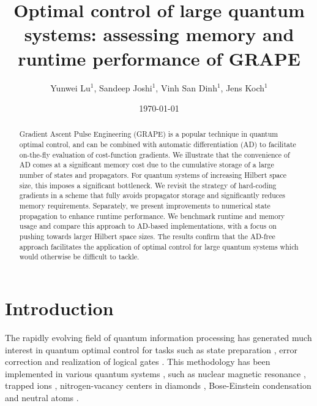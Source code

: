 \documentclass[letterpaper,10pt]{iopart}
\begin{document}
\title{Optimal control of large quantum systems: assessing memory and runtime performance of GRAPE}

\author{Yunwei Lu$^1$, Sandeep Joshi$^1$, Vinh San Dinh$^{1}$, Jens Koch$^1$}
\address{$^1$ Department of Physics and Astronomy, Northwestern University, Evanston, Illinois 60208, USA}



\date{\today}

\begin{abstract}
Gradient Ascent Pulse Engineering (GRAPE) is a popular technique in quantum optimal control, and can be combined with automatic differentiation (AD) to facilitate on-the-fly evaluation of cost-function gradients. We illustrate that the convenience of AD comes at a significant memory cost due to the cumulative storage of a large number of states and propagators. For quantum systems of increasing Hilbert space size, this imposes a significant bottleneck. We revisit the strategy of hard-coding gradients in a scheme that fully avoids propagator storage and significantly reduces memory requirements. Separately, we present improvements to numerical state propagation to enhance runtime performance. We benchmark runtime and memory usage and compare this approach to AD-based implementations, with a focus on pushing towards larger Hilbert space sizes. The results confirm that the AD-free approach facilitates the application of optimal control for large quantum systems which would otherwise be difficult to tackle.
\end{abstract}


\section{\label{sec:level1}Introduction}

The rapidly evolving field of quantum information processing has generated much interest in quantum optimal control for tasks such as state preparation  \cite{rojan2014arbitrarystate,bondar2023globally}, error correction \cite{waldherr2014quantumerror,gertler2021protecting} and realization of logical gates \cite{scabdelhafez2020universal,scallen2017optimal,schuang2014optimal,scwerninghaus2021leakage}. This methodology has been implemented in various quantum systems \cite{glaser2015training}, such as nuclear magnetic resonance \cite{nmrbretschneider2012conversion,nmrkehlet2004improving,nmrkhaneja2005optimal,nmrsimon2009optimal,nmrspinachhogben2011spinach,nmrxu2008designing}, trapped ions \cite{timuller2015phonon,tinebendahl2009optimal}, nitrogen-vacancy centers in diamonds \cite{nvangerer2013robust,nvchou2015optimal,nvdolde2014high,nvpoggiali2018optimal,nvpoulsen2021optimal,nvrembold2020introduction,nvyan2021population}, Bose-Einstein condensation  \cite{becamri2019optimal,becmennemann2015optimal,becsorensen2018qengine} and neutral atoms \cite{atomguo2019high,atomrosi2013fast}. 
\end{document}
